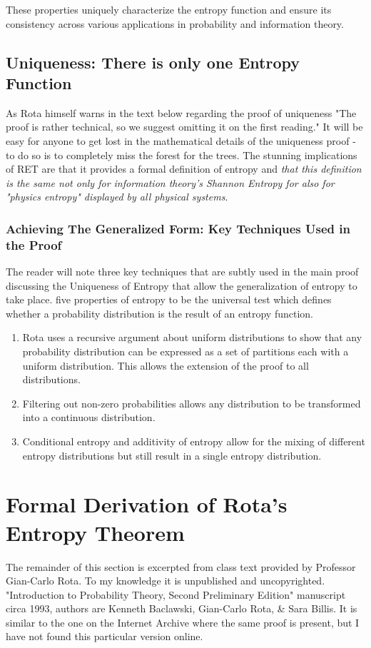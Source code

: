 \documentclass{report}
\begin{document}
These properties uniquely characterize the entropy function and ensure its consistency across various applications in probability and information theory.

\subsection*{Uniqueness: There is only one Entropy Function}
As Rota himself warns in the text below regarding the proof of uniqueness "The proof is rather technical, so we suggest omitting it on the first reading." It will be easy for anyone to get lost in the mathematical details of the uniqueness proof - to do so is to completely miss the forest for the trees. The stunning implications of RET are that it provides a formal definition of entropy and \emph{that this definition is the same not only for information theory's Shannon Entropy for also for "physics entropy" displayed by all physical systems}. 


\subsubsection*{Achieving The Generalized Form: Key Techniques Used in the Proof}
The reader will note three key techniques that are subtly used in the main proof discussing the Uniqueness of Entropy that allow the generalization of entropy to take place. five properties of entropy to be the universal test which defines whether a probability distribution is the result of an entropy function. 
\begin{enumerate}
    \item Rota uses a recursive argument about uniform distributions to show that any probability distribution can be expressed as a set of partitions each with a uniform distribution. This allows the extension of the proof to all distributions.
    \item Filtering out non-zero probabilities allows any distribution to be transformed into a continuous distribution.
    \item Conditional entropy and additivity of entropy allow for the mixing of different entropy distributions but still result in a single entropy distribution.
\end{enumerate}


\medskip
\medskip

\section*{Formal Derivation of Rota's Entropy Theorem}
The remainder of this section is excerpted from class text provided by Professor Gian-Carlo Rota. To my knowledge it is unpublished and uncopyrighted. "Introduction to Probability Theory, Second Preliminary Edition" manuscript circa 1993, authors are Kenneth Baclawski, Gian-Carlo Rota, \& Sara Billis. It is similar to the one on the Internet Archive\cite{RotaBaclawski} where the same proof is present, but I have not found this particular version online. 
\end{document}
